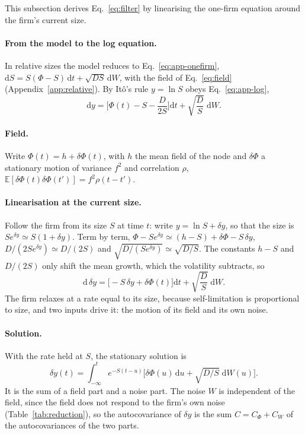 \documentclass[pre,twocolumn,superscriptaddress,nofootinbib]{revtex4-2}
\newcommand{\E}{\mathbb E}
\newcommand{\dd}{\mathrm d}
\begin{document}
This subsection derives Eq.~\eqref{eq:filter} by linearising the one-firm equation around the firm's current size.

\paragraph{From the model to the log equation.}  In relative sizes the model reduces to
Eq.~\eqref{eq:app-onefirm}, $\dd S=S(\Phi-S)\,\dd t+\sqrt{DS}\,\dd W$, with the field of Eq.~\eqref{eq:field}
(Appendix~\ref{app:relative}).  By It\^o's rule $y=\ln S$ obeys Eq.~\eqref{eq:app-log},
\begin{equation*}
\dd y=\Big[\Phi(t)-S-\frac{D}{2S}\Big]\dd t+\sqrt{\frac DS}\;\dd W .
\end{equation*}

\paragraph{Field.}  Write $\Phi(t)=h+\delta\Phi(t)$, with $h$ the mean field of the node and $\delta\Phi$ a stationary
motion of variance $f^2$ and correlation $\rho$, $\E[\delta\Phi(t)\delta\Phi(t')]=f^2\rho(t-t')$.

\paragraph{Linearisation at the current size.}  Follow the firm from its size $S$ at time $t$: write
$y=\ln S+\delta y$, so that the size is $Se^{\delta y}\simeq S(1+\delta y)$.  Term by term,
$\Phi-Se^{\delta y}\simeq(h-S)+\delta\Phi-S\,\delta y$, $D/(2Se^{\delta y})\simeq D/(2S)$ and
$\sqrt{D/(Se^{\delta y})}\simeq\sqrt{D/S}$.  The constants $h-S$ and $D/(2S)$ only shift the mean growth, which the
volatility subtracts, so
\begin{equation}
\dd\,\delta y=\big[-S\,\delta y+\delta\Phi(t)\big]\dd t+\sqrt{\frac DS}\;\dd W .
\label{eq:app-linear}
\end{equation}
The firm relaxes at a rate equal to its size, because self-limitation is proportional to size, and two inputs drive
it: the motion of its field and its own noise.

\paragraph{Solution.}  With the rate held at $S$, the stationary solution is
\begin{equation*}
\delta y(t)=\int_{-\infty}^{t}e^{-S(t-u)}\Big[\delta\Phi(u)\,\dd u+\sqrt{D/S}\;\dd W(u)\Big].
\end{equation*}
It is the sum of a field part and a noise part.  The noise $W$ is independent of the field, since the field does
not respond to the firm's own noise (Table~\ref{tab:reduction}), so the autocovariance of $\delta y$ is the sum
$C=C_\Phi+C_W$ of the autocovariances of the two parts.
\end{document}
